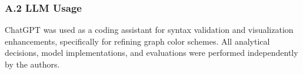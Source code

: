 \documentclass[11pt]{article}
\begin{document}
\hypertarget{a.2-llm-usage}{%
\subsubsection{A.2 LLM Usage}\label{a.2-llm-usage}}

ChatGPT was used as a coding assistant for syntax validation and
visualization enhancements, specifically for refining graph color
schemes. All analytical decisions, model implementations, and
evaluations were performed independently by the authors.


    
    
    
\end{document}
